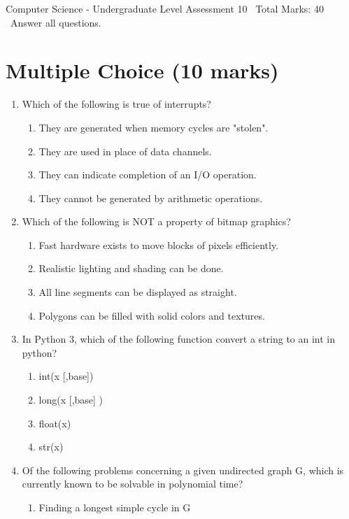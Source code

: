\documentclass[12pt]{article}
\begin{document}
\begin{center}
Computer Science - Undergraduate Level Assessment 10 \
Total Marks: 40 \
Answer all questions.
\end{center}

\section*{Multiple Choice (10 marks)}
\begin{enumerate}[label=\arabic*.]
\item Which of the following is true of interrupts?
\begin{enumerate}[label=(\alph*)]
    \item They are generated when memory cycles are "stolen".
    \item They are used in place of data channels.
    \item They can indicate completion of an I/O operation.
    \item They cannot be generated by arithmetic operations.
\end{enumerate}
\item Which of the following is NOT a property of bitmap graphics?
\begin{enumerate}[label=(\alph*)]
    \item Fast hardware exists to move blocks of pixels efficiently.
    \item Realistic lighting and shading can be done.
    \item All line segments can be displayed as straight.
    \item Polygons can be filled with solid colors and textures.
\end{enumerate}
\item In Python 3, which of the following function convert a string to an int in python?
\begin{enumerate}[label=(\alph*)]
    \item int(x [,base])
    \item long(x [,base] )
    \item float(x)
    \item str(x)
\end{enumerate}
\item Of the following problems concerning a given undirected graph G, which is currently known to be solvable in polynomial time?
\begin{enumerate}[label=(\alph*)]
    \item Finding a longest simple cycle in G

\end{enumerate}
\end{enumerate}
\end{document}
